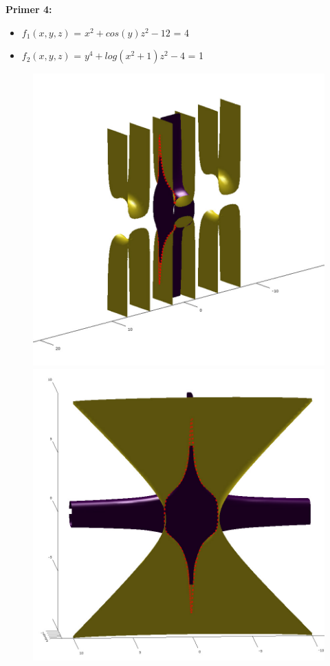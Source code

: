 \documentclass[12pt]{article}
\begin{document}
	\begin{minipage}{\textwidth}
		\textbf{\large{Primer 4:}}
		\begin{itemize}  
			\item $f_{1}(x,y,z)$ = $x^2 + cos(y)z^2 - 12$ = 4
			\item $f_{2}(x,y,z)$ = $y^4 + log(x^2 + 1)z^2 - 4$ = 1
		\end{itemize}
		\begin{figure}[H]
			\centering
			\includegraphics[scale=0.32]{primer4_1}
			\includegraphics[scale=0.32]{primer4_2}

\end{figure}
\end{minipage}
\end{document}
